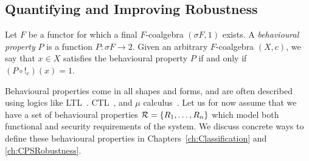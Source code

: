




\subsection{Quantifying and Improving Robustness}
\label{sec:Latent:Robustness}
\begin{definition}
    \label{def:Latent:BehaviouralProperty}
    Let $F$ be a functor for which a final $F$-coalgebra $(\sigma F, 1)$ exists. A \emph{behavioural property} $P$ is a function $P\colon \sigma F\rightarrow 2$. Given an arbitrary $F$-coalgebra $(X,c)$, we say that $x\in X$ satisfies the behavioural property $P$ if and only if $(P\circ !_c)(x)=1$.
\end{definition}
Behavioural properties come in all shapes and forms, and are often described using logics like LTL~\cite{LTL}. CTL~\cite{CTL}, and $\mu$ calculus~\cite{MuCalculus}. Let us for now assume that we have a set of behavioural properties $\mathcal{R}=\left\{R_1, \ldots, R_n\right\}$ which model both functional and security requirements of the system. We discuss concrete ways to define these behavioural properties in Chapters~\ref{ch:Classification} and \ref{ch:CPSRobustness}.

